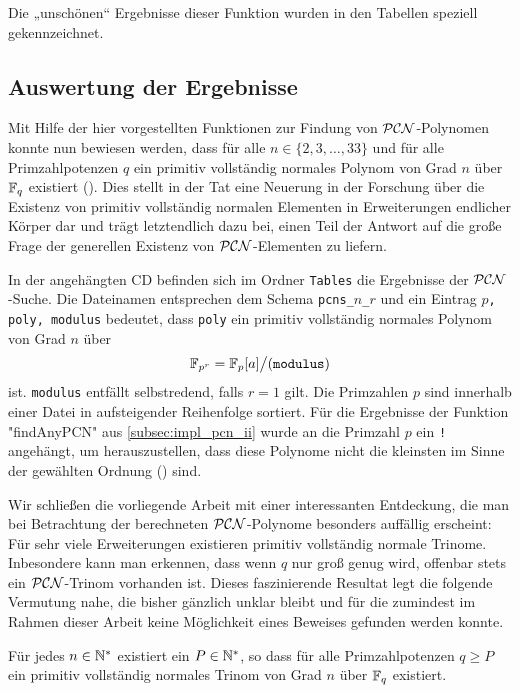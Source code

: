 Die „unschönen“ Ergebnisse dieser Funktion wurden in den Tabellen speziell
gekennzeichnet.


\subsection{Auswertung der Ergebnisse}

Mit Hilfe der hier vorgestellten Funktionen zur Findung von $\mathcal{PCN}$-Polynomen
konnte nun bewiesen werden, dass für alle $n \in \{ 2,3,\ldots,33\}$ und für
alle Primzahlpotenzen $q$ ein primitiv vollständig normales Polynom von Grad
$n$ über $\mathbb{F}_q$ existiert (). Dies stellt in der Tat
eine Neuerung in der Forschung über die Existenz von primitiv vollständig
normalen Elementen in Erweiterungen endlicher Körper dar und trägt letztendlich
dazu bei, einen Teil der Antwort auf die große Frage der generellen Existenz
von $\mathcal{PCN}$-Elementen zu liefern.

In der angehängten CD befinden sich im Ordner \texttt{Tables} die Ergebnisse
der $\mathcal{PCN}$-Suche. Die Dateinamen entsprechen dem Schema 
\texttt{pcns\_$n$\_$r$}
und ein Eintrag \texttt{$p$, poly, modulus} bedeutet, dass
\texttt{poly} ein primitiv vollständig normales Polynom von Grad $n$ über 
\[ \mathbb{F}_{p^r} = \mathbb{F}_p[a]\big/(\texttt{modulus}) \]
ist. \texttt{modulus} entfällt selbstredend, falls $r = 1$ gilt. Die Primzahlen
$p$ sind innerhalb einer Datei in aufsteigender Reihenfolge sortiert.
Für die Ergebnisse der Funktion "findAnyPCN" aus \autoref{subsec:impl_pcn_ii}
wurde an die Primzahl $p$ ein \texttt{!} angehängt, um herauszustellen, dass
diese Polynome nicht die kleinsten im Sinne der gewählten Ordnung 
() sind.


Wir schließen die vorliegende Arbeit mit einer interessanten Entdeckung, die
man bei Betrachtung der berechneten $\mathcal{PCN}$-Polynome besonders auffällig
erscheint:
Für sehr viele Erweiterungen existieren primitiv vollständig normale Trinome. 
Inbesondere kann man erkennen, dass wenn $q$ nur groß genug wird,
offenbar stets ein $\mathcal{PCN}$-Trinom vorhanden ist. Dieses faszinierende Resultat 
legt die folgende Vermutung nahe, die bisher gänzlich unklar bleibt und für die 
zumindest im Rahmen dieser Arbeit keine Möglichkeit eines 
Beweises gefunden werden konnte.

\begin{vermutung}
  Für jedes $n\in \mathbb{N}^\ast$ existiert ein $P\in \mathbb{N}^\ast$, so dass für alle
  Primzahlpotenzen $q \geq P$ ein primitiv vollständig normales Trinom von Grad
  $n$ über $\mathbb{F}_q$ existiert.
\end{vermutung}
